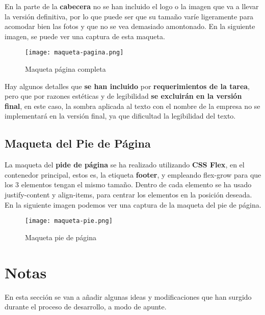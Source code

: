 En la parte de la \textbf{cabecera} no se han incluido el logo o la imagen que va a llevar la versión definitiva, por lo que puede ser que su tamaño varíe ligeramente para acomodar bien las fotos y que no se vea demasiado amontonado. En la siguiente imagen, se puede ver una captura de esta maqueta.

\begin{figure}[H]
    \centering
    \texttt{[image: maqueta-pagina.png]}
    \caption{Maqueta página completa}
\end{figure}

Hay algunos detalles que \textbf{se han incluido} por \textbf{requerimientos de la tarea}, pero que por razones estéticas y de legibilidad \textbf{se excluirán en la versión final}, en este caso, la sombra aplicada al texto con el nombre de la empresa no se implementará en la versión final, ya que dificultad la legibilidad del texto.

\subsection{Maqueta del Pie de Página}
La maqueta del \textbf{pide de página} se ha realizado utilizando  \textbf{CSS Flex}, en el contenedor principal, estos es, la etiqueta \textbf{footer}, y empleando flex-grow para que los 3 elementos tengan el mismo tamaño. Dentro de cada elemento se ha usado justify-content y align-items, para centrar los elementos en la posición deseada. En la siguiente imagen podemos ver una captura de la maqueta del pie de página.

\begin{figure}[H]
    \centering
    \texttt{[image: maqueta-pie.png]}
    \caption{Maqueta pie de página}
\end{figure}

\section{Notas}

En esta sección se van a añadir algunas ideas y modificaciones que han surgido durante el proceso de desarrollo, a modo de apunte.


